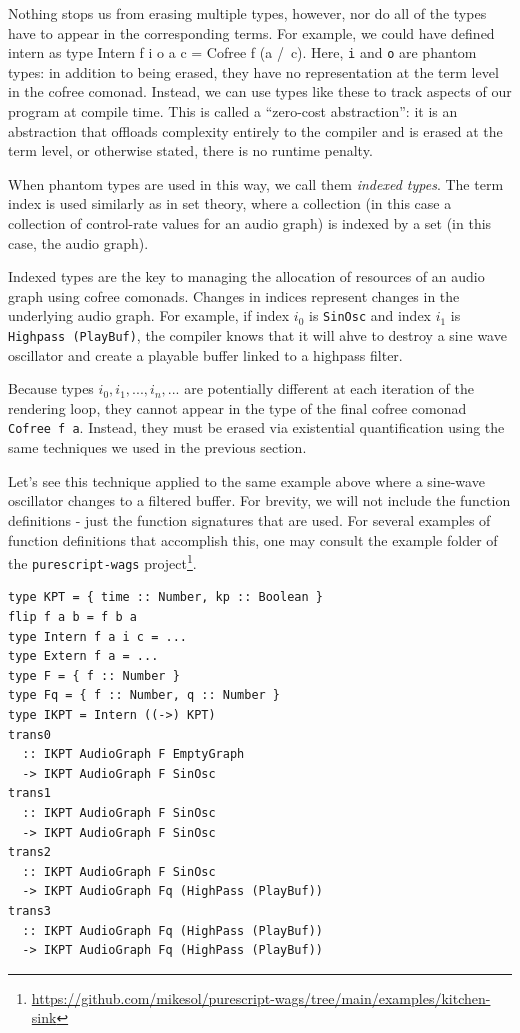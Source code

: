 \documentclass{article}
\begin{document}
Nothing stops us from erasing multiple types, however, nor do all of the types have to appear in the corresponding terms. For example, we could have defined intern as {type Intern f i o a c = Cofree f (a /\ c)}. Here, \texttt{i} and \texttt{o} are phantom types: in addition to being erased, they have no representation at the term level in the cofree comonad. Instead, we can use types like these to track aspects of our program at compile time. This is called a ``zero-cost abstraction'': it is an abstraction that offloads complexity entirely to the compiler and is erased at the term level, or otherwise stated, there is no runtime penalty.

When phantom types are used in this way, we call them \textit{indexed types}. The term index is used similarly as in set theory, where a collection (in this case a collection of control-rate values for an audio graph) is indexed by a set (in this case, the audio graph).

Indexed types are the key to managing the allocation of resources of an audio graph using cofree comonads. Changes in indices represent changes in the underlying audio graph. For example, if index $i_0$ is \texttt{SinOsc} and index $i_1$ is \texttt {Highpass (PlayBuf)}, the compiler knows that it will ahve to destroy a sine wave oscillator and create a playable buffer linked to a highpass filter.

Because types $i_0,i_1,...,i_n,...$ are potentially different at each iteration of the rendering loop, they cannot appear in the type of the final cofree comonad \texttt{Cofree f a}. Instead, they must be erased via existential quantification using the same techniques we used in the previous section.

Let's see this technique applied to the same example above where a sine-wave oscillator changes to a filtered buffer. For brevity, we will not include the function definitions - just the function signatures that are used. For several examples of function definitions that accomplish this, one may consult the example folder of the \texttt{purescript-wags} project\footnote{\url{https://github.com/mikesol/purescript-wags/tree/main/examples/kitchen-sink}}.

\lstset{language=Haskell, style=psstyle}
\begin{lstlisting}
type KPT = { time :: Number, kp :: Boolean }
flip f a b = f b a
type Intern f a i c = ...
type Extern f a = ...
type F = { f :: Number }
type Fq = { f :: Number, q :: Number }
type IKPT = Intern ((->) KPT)
trans0
  :: IKPT AudioGraph F EmptyGraph
  -> IKPT AudioGraph F SinOsc
trans1
  :: IKPT AudioGraph F SinOsc
  -> IKPT AudioGraph F SinOsc
trans2
  :: IKPT AudioGraph F SinOsc
  -> IKPT AudioGraph Fq (HighPass (PlayBuf))
trans3
  :: IKPT AudioGraph Fq (HighPass (PlayBuf))
  -> IKPT AudioGraph Fq (HighPass (PlayBuf))
\end{lstlisting}
\end{document}
